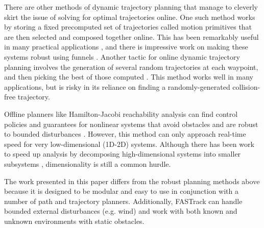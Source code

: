 There are other methods of dynamic trajectory planning that manage to cleverly skirt the issue of solving for optimal trajectories online.  One such method works by storing a fixed precomputed set of trajectories called motion primitives that are then selected and composed together online.  This has been remarkably useful in many practical applications \cite{Gillula2010, Dey2014, Barry2016}, and there is impressive work on making these systems robust using funnels \cite{Majumdar2016]}.  Another tactic for online dynamic trajectory planning involves the generation of several random trajectories at each waypoint, and then picking the best of those computed \cite{Kalakrishnan2011, Schwesinger2013, Krusi2015}.  This method works well in many applications, but is risky in its reliance on finding a randomly-generated collision-free trajectory.  

Offline planners like Hamilton-Jacobi reachability analysis can find control policies and guarantees for nonlinear systems that avoid obstacles and are robust to bounded disturbances \cite{Mitchell05}.  However, this method can only approach real-time speed for very low-dimensional (1D-2D) systems. Although there has been work to speed up analysis by decomposing high-dimensional systems into smaller subsystems \cite{Chen2016a, Chen2016b}, dimensionality is still a common hurdle.

The work presented in this paper differs from the robust planning methods above because it is designed to be modular and easy to use in conjunction with a number of path and trajectory planners. Additionally, FASTrack can handle bounded external disturbances (e.g. wind) and work with both known and unknown environments with static obstacles. 